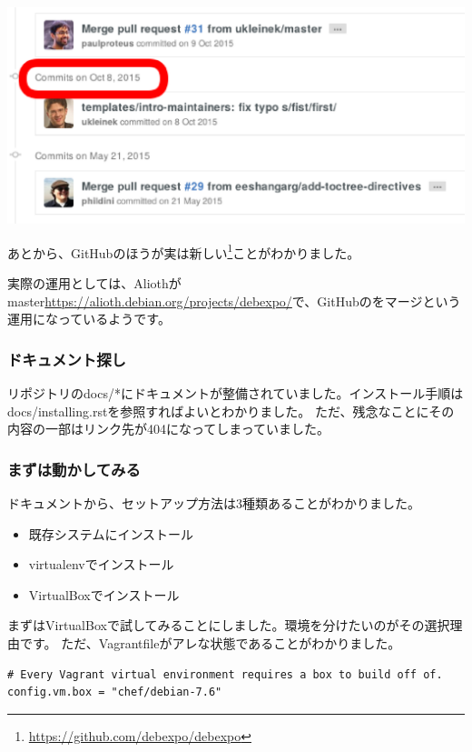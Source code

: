 \documentclass[mingoth,a4paper]{jsarticle}
\begin{document}
\begin{screen}
\includegraphics[width=0.7\hsize]{image201606/last-change-on-github.eps}
\end{screen}

あとから、GitHubのほうが実は新しい\footnote{\url{https://github.com/debexpo/debexpo}}ことがわかりました。

実際の運用としては、Aliothがmaster\url{https://alioth.debian.org/projects/debexpo/}で、GitHubのをマージという運用になっているようです。

\subsubsection{ドキュメント探し}

リポジトリのdocs/*にドキュメントが整備されていました。インストール手順はdocs/installing.rstを参照すればよいとわかりました。
ただ、残念なことにその内容の一部はリンク先が404になってしまっていました。

\subsubsection{まずは動かしてみる}

ドキュメントから、セットアップ方法は3種類あることがわかりました。

\begin{itemize}
  \item 既存システムにインストール
  \item virtualenvでインストール
  \item VirtualBoxでインストール
\end{itemize}

まずはVirtualBoxで試してみることにしました。環境を分けたいのがその選択理由です。
ただ、Vagrantfileがアレな状態であることがわかりました。

\begin{screen}
\begin{verbatim}
# Every Vagrant virtual environment requires a box to build off of.
config.vm.box = "chef/debian-7.6"
\end{verbatim}
\end{screen}
\end{document}
